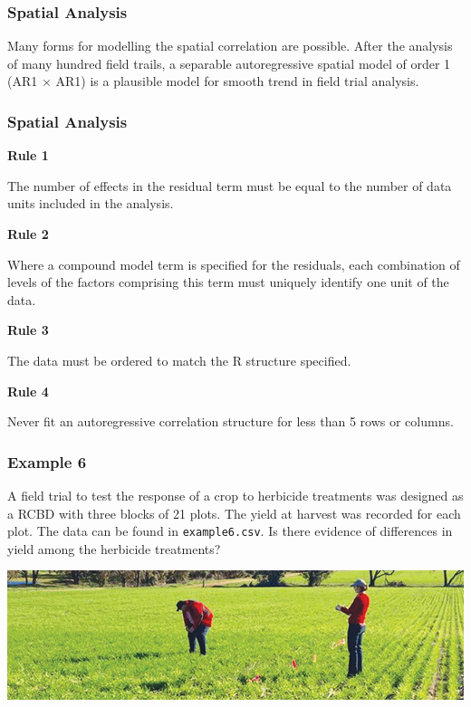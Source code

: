 \begin{frame}\frametitle{Spatial Analysis}
Many forms for modelling the spatial correlation are possible. After the analysis of many hundred field trails, a
separable autoregressive spatial model of order 1 (AR1 $\times$ AR1) is a plausible model for smooth trend in field
trial analysis.

\end{frame}


\begin{frame}\frametitle{Spatial Analysis}
\textbf{Rule 1}

The number of effects in the residual term must be equal to the number of data units included in the analysis.


\textbf{Rule 2}

Where a compound model term is specified for the residuals, each combination of levels of the factors comprising this
term must uniquely identify one unit of the data.

\textbf{Rule 3}

The data must be ordered to match the R structure specified.

\textbf{Rule 4}

Never fit an autoregressive correlation structure for less than 5 rows or
columns.

\end{frame}



\begin{frame}\frametitle{Example 6}
A field trial to test the response of a crop to herbicide treatments was
designed as a RCBD with three blocks of 21 plots. The yield at harvest was
recorded for each plot.  The data can be found in \texttt{example6.csv}. Is
there evidence of differences in yield among the herbicide treatments?

\begin{center}
\includegraphics[height = 0.3\textheight]{fieldherb.png}
\end{center}
\end{frame}

